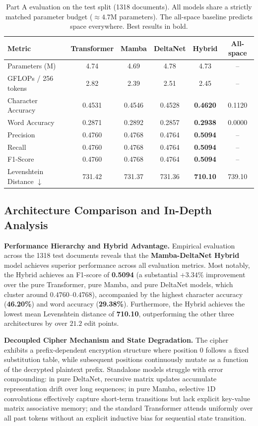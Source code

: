 \documentclass[12pt,a4paper]{article}
\begin{document}
\begin{table}[h]
\centering
\caption{Part A evaluation on the test split (1318 documents). All models share a strictly matched parameter budget ($\approx 4.7$M parameters). The all-space baseline predicts space everywhere. Best results in bold.}
\label{tab:part1_results}
\begin{tabular}{lccccc}
\toprule
Metric & Transformer & Mamba & DeltaNet & Hybrid & All-space \\
\midrule
Parameters (M) & 4.74 & 4.69 & 4.78 & 4.73 & -- \\
GFLOPs / 256 tokens & 2.82 & 2.39 & 2.51 & 2.45 & -- \\
\midrule
Character Accuracy & 0.4531 & 0.4546 & 0.4528 & \textbf{0.4620} & 0.1120 \\
Word Accuracy & 0.2871 & 0.2892 & 0.2857 & \textbf{0.2938} & 0.0000 \\
Precision & 0.4760 & 0.4768 & 0.4764 & \textbf{0.5094} & -- \\
Recall & 0.4760 & 0.4768 & 0.4764 & \textbf{0.5094} & -- \\
F1-Score & 0.4760 & 0.4768 & 0.4764 & \textbf{0.5094} & -- \\
Levenshtein Distance $\downarrow$ & 731.42 & 731.37 & 731.36 & \textbf{710.10} & 739.10 \\
\bottomrule
\end{tabular}
\end{table}

\subsection{Architecture Comparison and In-Depth Analysis}

\textbf{Performance Hierarchy and Hybrid Advantage.} Empirical evaluation across the 1318 test documents reveals that the \textbf{Mamba-DeltaNet Hybrid} model achieves superior performance across all evaluation metrics. Most notably, the Hybrid achieves an F1-score of \textbf{0.5094} (a substantial $+3.34\%$ improvement over the pure Transformer, pure Mamba, and pure DeltaNet models, which cluster around $0.4760$--$0.4768$), accompanied by the highest character accuracy (\textbf{46.20\%}) and word accuracy (\textbf{29.38\%}). Furthermore, the Hybrid achieves the lowest mean Levenshtein distance of \textbf{710.10}, outperforming the other three architectures by over $21.2$ edit points.

\textbf{Decoupled Cipher Mechanism and State Degradation.} The cipher exhibits a prefix-dependent encryption structure where position 0 follows a fixed substitution table, while subsequent positions continuously mutate as a function of the decrypted plaintext prefix. Standalone models struggle with error compounding: in pure DeltaNet, recursive matrix updates accumulate representation drift over long sequences; in pure Mamba, selective 1D convolutions effectively capture short-term transitions but lack explicit key-value matrix associative memory; and the standard Transformer attends uniformly over all past tokens without an explicit inductive bias for sequential state transition. 
\end{document}
